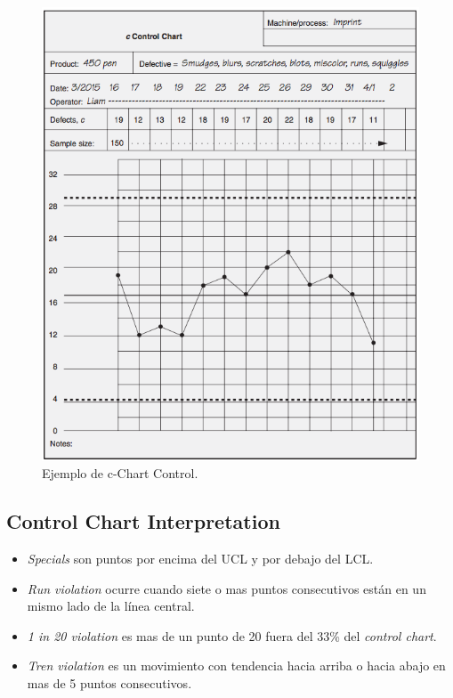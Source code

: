 \documentclass[oneside]{book}
\begin{document}
\begin{figure}[H]
	\centering
	\includegraphics[width=120mm]{imagenes/cChartEjemplo.png}
	\caption{Ejemplo de c-Chart Control.}
	\label{fig:cChartEjemplo}
\end{figure}

\subsection{Control Chart Interpretation}

\begin{itemize}
	\item \textit{Specials} son puntos por encima del UCL y por debajo del LCL.
	\item \textit{Run violation} ocurre cuando siete o mas puntos consecutivos están en un mismo lado de la línea central.
	\item \textit{1 in 20 violation} es mas de un punto de 20 fuera del 33\% del \textit{control chart}.
	\item \textit{Tren violation} es un movimiento con tendencia hacia arriba o hacia abajo en mas de 5 puntos consecutivos.
\end{itemize}
\end{document}
